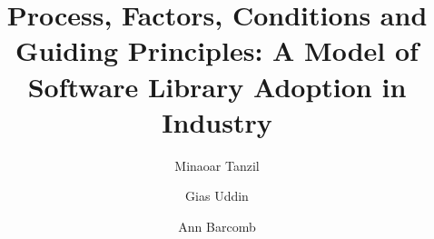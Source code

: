 \documentclass[sigconf,review,anonymous, table]{acmart}
\begin{document}

\title{Process, Factors, Conditions and Guiding Principles: A Model of Software Library Adoption in Industry}



\author{Minaoar Tanzil}
\author{Gias Uddin}
\author{Ann Barcomb}


\renewcommand{\shortauthors}{Tanzil et al.}
\end{document}
